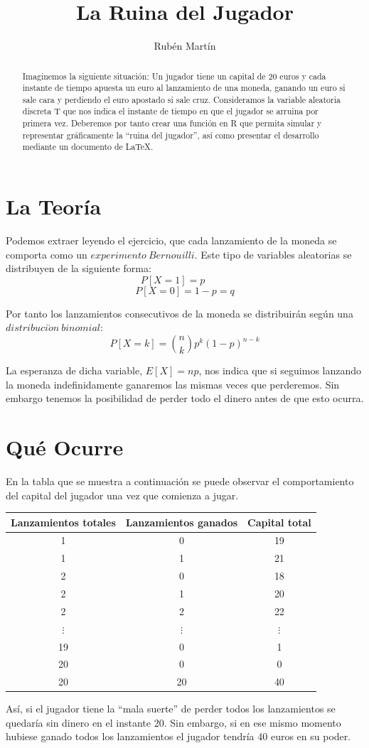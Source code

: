 \documentclass[10pt,a4paper]{article}
\author{Rubén Martín}
\title{La Ruina del Jugador}
\date{}
\begin{document}
\maketitle


\begin{abstract}Imaginemos la siguiente situación: Un jugador tiene un capital de 20 euros y cada instante de tiempo apuesta un euro al lanzamiento de una moneda, ganando un euro si sale cara y perdiendo el euro apostado si sale cruz. Consideramos la variable aleatoria discreta T que nos indica el instante de tiempo en que el jugador se arruina por primera vez. Deberemos por tanto crear una función en R que permita simular y representar gráficamente la ``ruina del jugador'', así como presentar el desarrollo mediante un documento de LaTeX.
\end{abstract}


\tableofcontents

\newpage
\section{La Teoría}
Podemos extraer leyendo el ejercicio, que cada lanzamiento de la moneda se comporta como un $experimento\ Bernouilli$. Este tipo de variables aleatorias\cite{prob} se distribuyen de la siguiente forma:
$$P[X=1]=p\ \ \ \ \ \ \ \ \ \ \ $$
$$P[X=0]=1-p=q$$

Por tanto los lanzamientos consecutivos de la moneda se distribuirán según una $distribuci\acute{o}n\ binomial$:
$$P[X=k]=\binom{n}{k} p^k(1-p)^{n-k}$$

La esperanza de dicha variable, $E[X]=np$, nos indica que si seguimos lanzando la moneda indefinidamente ganaremos  las mismas veces que perderemos. Sin embargo tenemos la posibilidad de perder todo el dinero antes de que esto ocurra.

\section{Qué Ocurre}
En la tabla que se muestra a continuación se puede observar el comportamiento del capital del jugador una vez que comienza a jugar.

\begin{center}
\begin{tabular}[t]{c c c}
Lanzamientos totales & Lanzamientos ganados & Capital total\\
\hline
1 & 0 & 19\\
1 & 1 & 21\\
2 & 0 & 18\\
2 & 1 & 20\\
2 & 2 & 22\\
$\vdots$ & $\vdots$ & $\vdots$\\
19 & 0 & 1\\
20 & 0 & 0\\
20 & 20 & 40\\
\end{tabular}
\end{center}
Así, si el jugador tiene la ``mala suerte'' de perder todos los lanzamientos se quedaría sin dinero en el instante 20. Sin embargo, si en ese mismo momento hubiese ganado todos los lanzamientos el jugador tendría 40 euros en su poder.
\newpage
\end{document}
